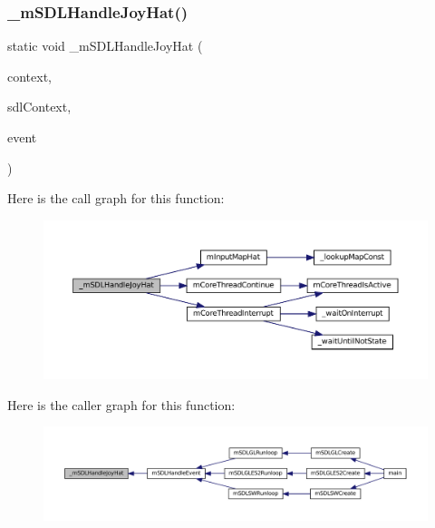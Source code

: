 \subsubsection{\texorpdfstring{\+\_\+m\+S\+D\+L\+Handle\+Joy\+Hat()}{\_mSDLHandleJoyHat()}}
{\footnotesize\ttfamily static void \+\_\+m\+S\+D\+L\+Handle\+Joy\+Hat (\begin{DoxyParamCaption}\item[{struct m\+Core\+Thread $\ast$}]{context,  }\item[{struct \mbox{\hyperlink{sdl-events_8h_structm_s_d_l_player}{m\+S\+D\+L\+Player}} $\ast$}]{sdl\+Context,  }\item[{const struct S\+D\+L\+\_\+\+Joy\+Hat\+Event $\ast$}]{event }\end{DoxyParamCaption})\hspace{0.3cm}{\ttfamily [static]}}

Here is the call graph for this function\+:
\nopagebreak
\begin{figure}[H]
\begin{center}
\leavevmode
\includegraphics[width=350pt]{sdl-events_8c_a67374fa271dc2b13d5f8ec2d42d2d0ce_cgraph}
\end{center}
\end{figure}
Here is the caller graph for this function\+:
\nopagebreak
\begin{figure}[H]
\begin{center}
\leavevmode
\includegraphics[width=350pt]{sdl-events_8c_a67374fa271dc2b13d5f8ec2d42d2d0ce_icgraph}
\end{center}
\end{figure}
\mbox{\label{sdl-events_8c_aa2c971f6d7cf960e3add9bd2252c8da5}} 
